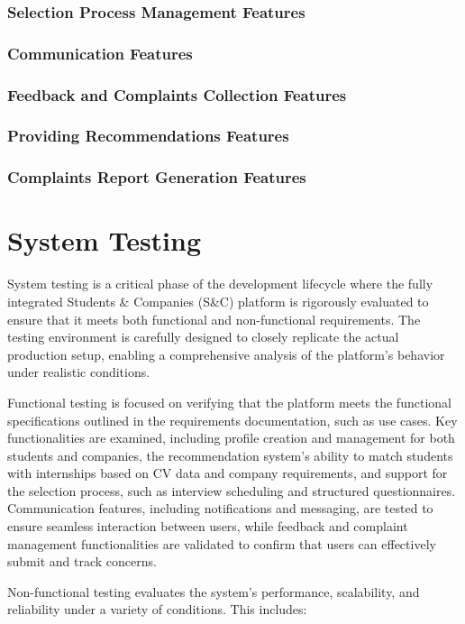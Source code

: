 \subsubsection{Selection Process Management Features}
\subsubsection{Communication Features}
\subsubsection{Feedback and Complaints Collection Features}
\subsubsection{Providing Recommendations Features}
\subsubsection{Complaints Report Generation Features}


\newpage
\section{System Testing}

System testing is a critical phase of the development lifecycle where the fully
integrated Students \& Companies (S\&C) platform is rigorously evaluated to ensure that it
meets both functional and non-functional requirements. The testing environment is carefully
designed to closely replicate the actual production setup, enabling a comprehensive analysis
of the platform's behavior under realistic conditions.

Functional testing is focused on verifying that the platform meets the functional specifications
outlined in the requirements documentation, such as use cases. Key functionalities are examined,
including profile creation and management for both students and companies, the recommendation
system’s ability to match students with internships based on CV data and company requirements,
and support for the selection process, such as interview scheduling and structured questionnaires.
Communication features, including notifications and messaging, are tested to ensure seamless
interaction between users, while feedback and complaint management functionalities are validated
to confirm that users can effectively submit and track concerns.

Non-functional testing evaluates the system’s performance, scalability, and reliability under
a variety of conditions. This includes:

